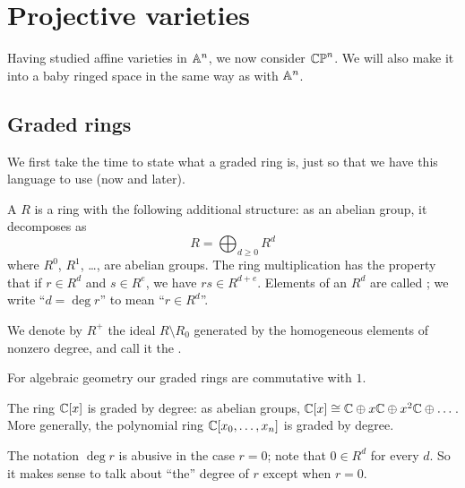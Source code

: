\chapter{Projective varieties}
Having studied affine varieties in $\mathbb A^n$, we now consider $\mathbb{CP}^n$.
We will also make it into a baby ringed space
in the same way as with $\mathbb A^n$.

\section{Graded rings}
We first take the time to state what a graded ring is,
just so that we have this language to use (now and later).

\begin{definition}
	A  $R$ is a ring with the following additional structure:
	as an abelian group, it decomposes as
	\[ R = \bigoplus_{d \ge 0} R^d \]
	where $R^0$, $R^1$, \dots, are abelian groups.
	The ring multiplication has the property that
	if $r \in R^d$ and $s \in R^e$, we have $rs \in R^{d+e}$.
	Elements of an $R^d$ are called ;
	we write ``$d = \deg r$'' to mean ``$r \in R^d$''.

	We denote by $R^+$ the ideal $R \setminus R_0$ generated by
	the homogeneous elements of nonzero degree,
	and call it the .
\end{definition}
\begin{remark}
	For algebraic geometry our graded rings are commutative with $1$.
\end{remark}
\begin{example}
	\listhack
	\begin{enumerate}[(a)]
		\ii The ring $\mathbb C[x]$ is graded by degree: as abelian groups,
		$\mathbb C[x] \cong \mathbb C \oplus x\mathbb C \oplus x^2\mathbb C \oplus \dots$.
		\ii More generally, the polynomial ring $\mathbb C[x_0, \dots, x_n]$
		is graded by degree.
	\end{enumerate}
\end{example}
\begin{abuse}
	The notation $\deg r$ is abusive in the case $r = 0$;
	note that $0 \in R^d$ for every $d$.
	So it makes sense to talk about ``the'' degree of $r$
	except when $r = 0$.
\end{abuse}

